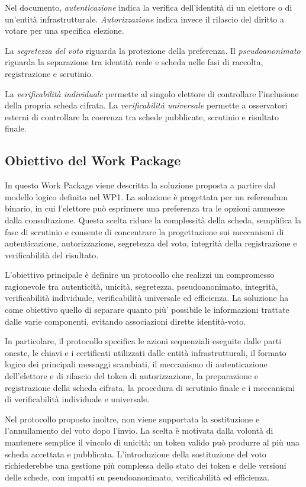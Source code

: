 \documentclass[a4paper,12pt]{article}
\begin{document}
Nel documento, \emph{autenticazione} indica la verifica dell'identità di un elettore o di un'entità infrastrutturale. \emph{Autorizzazione} indica invece il rilascio del diritto a votare per una specifica elezione.

La \emph{segretezza del voto} riguarda la protezione della preferenza. Il \emph{pseudoanonimato} riguarda la separazione tra identità reale e scheda nelle fasi di raccolta, registrazione e scrutinio.

La \emph{verificabilità individuale} permette al singolo elettore di controllare l'inclusione della propria scheda cifrata. La \emph{verificabilità universale} permette a osservatori esterni di controllare la coerenza tra schede pubblicate, scrutinio e risultato finale.
\subsection{Obiettivo del Work Package}

In questo Work Package viene descritta la soluzione proposta a partire dal modello logico definito nel WP1.
La soluzione \`e progettata per un referendum binario, in cui l'elettore pu\`o esprimere una preferenza tra le opzioni ammesse dalla consultazione.
Questa scelta riduce la complessit\`a della scheda, semplifica la fase di scrutinio e consente di concentrare la progettazione sui meccanismi di autenticazione, autorizzazione, segretezza del voto, integrit\`a della registrazione e verificabilit\`a del risultato.

L'obiettivo principale \`e definire un protocollo che realizzi un compromesso ragionevole tra autenticit\`a, unicit\`a, segretezza, pseudoanonimato, integrit\`a, verificabilit\`a individuale, verificabilit\`a universale ed efficienza.
La soluzione ha come obiettivo quello di separare quanto pi\`u' possibile le informazioni trattate dalle varie componenti, evitando associazioni dirette identit\`a-voto.

In particolare, il protocollo specifica le azioni sequenziali eseguite dalle parti oneste, le chiavi e i certificati utilizzati dalle entit\`a infrastrutturali, il formato logico dei principali messaggi scambiati, il meccanismo di autenticazione dell'elettore e di rilascio del token di autorizzazione, la preparazione e registrazione della scheda cifrata, la procedura di scrutinio finale e i meccanismi di verificabilit\`a individuale e universale.

Nel protocollo proposto inoltre, non viene supportata la sostituzione e l'annullamento del voto dopo l'invio. 
La scelta \`e motivata dalla volont\`a di mantenere semplice il vincolo di unicit\`a: un token valido pu\`o produrre al pi\`u una scheda accettata e pubblicata. 
L'introduzione della sostituzione del voto richiederebbe una gestione pi\`u complessa dello stato dei token e delle versioni delle schede, con impatti su pseudoanonimato, verificabilit\`a ed efficienza.
\end{document}
